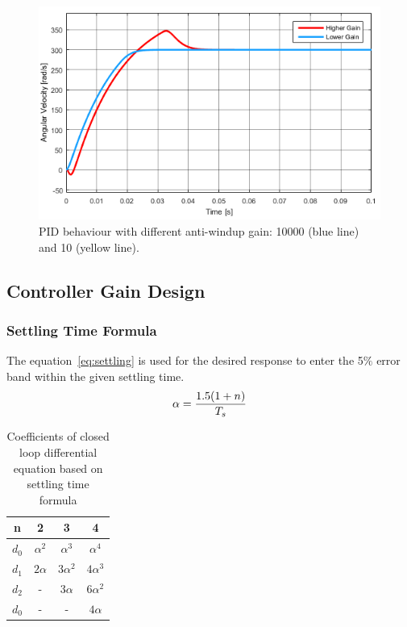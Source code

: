 \begin{figure}[!h]
	\centering
	\includegraphics[width=.6\linewidth]{graphics/pidwindupvaluecomp}
	\caption{PID behaviour with different anti-windup gain: 10000 (blue line) and 10 (yellow line).}
	\label{fig:pidwindupvaluecomp}
\end{figure}


\subsection{Controller Gain Design}

\subsubsection{Settling Time Formula}

The equation~\ref{eq:settling} is used for the desired response to enter the 5$\%$ error band within the given settling time.
\begin{equation}
\centering
\label{eq:settling}
\alpha = \dfrac{1.5(1 + n)}{T_s}
\end{equation}

\begin{table}[!h]
	\caption{ Coefficients of
		closed loop differential
		equation based on settling
		time formula\cite{feedback}}
	\centering
	\begin{tabular}{|c|c|c|c|}
		\hline
		n & 2 & 3 & 4\\
		\hline
		$d_0$ & $\alpha^2$ & $\alpha^3$ & $\alpha^4$\\ 
		$d_1$ & $2\alpha$ & $3\alpha^2$ & $4\alpha^3$\\
		$d_2$ & - & $3\alpha$ & $6\alpha^2$\\
		$d_0$ & - & - & $4\alpha$\\
		\hline	
		
	\end{tabular}
	\label{table:coefsettlingtime}
\end{table}


